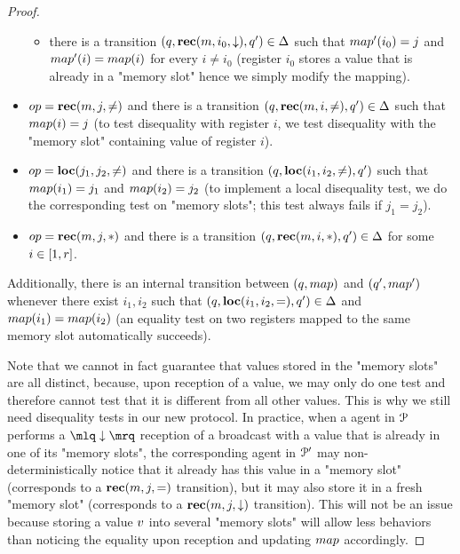 \begin{proof}
\begin{itemize}
\begin{itemize}
			\item there is a transition $(q, \textbf{rec}(m, i_0, \downarrow), q') \in \Delta$ such that $\map'(i_0)=j$ and $\map'(i) = \map(i)$ for every $i \neq i_0$ (register $i_0$ stores a value that is already in a "memory slot" hence we simply modify the mapping).
		\end{itemize} 
		
		\item $\op = \rec{m}{j}{\diseqtestact}$ and there is a transition $(q, \textbf{rec}(m, i, {\ne}), q') \in \Delta$ such that $\map(i)=j$ (to test disequality with register $i$, we test disequality with the "memory slot" containing value of register $i$).
		

		\item $\op=\loc{j_1}{j_2}{\diseqtestact}$ and there is a transition $(q, \textbf{loc}(i_1,i_2,{\ne}), q')$ such that $\map(i_1)=j_1$ and $\map(i_2) = j_2$ (to implement a local disequality test, we do the corresponding test on "memory slots"; this test always fails if $j_1 = j_2$).
		
		
		\item $\op = \rec{m}{j}{\dummyact}$ and there is a transition $(q, \textbf{rec}(m, i, {*}), q') \in \Delta$ for some $i \in [1,r]$.
	\end{itemize}
	
	Additionally, there is an internal transition between $(q,\map)$ and $(q',\map')$ whenever there exist $i_1, i_2$ such that $(q, \textbf{loc}(i_1,i_2,{=}), q') \in \Delta$ and $\map(i_1) = \map(i_2)$ (an equality test on two registers mapped to the same memory slot automatically succeeds).

	Note that we cannot in fact guarantee that values stored in the "memory slots" are all distinct, because, upon reception of a value, we may only do one test and therefore cannot test that it is different from all other values. This is why we still need disequality tests in our new protocol. In practice, when a agent in $\mathcal{P}$ performs a $\quotemarks{\enregact}$ reception of a broadcast with a value that is already in one of its "memory slots", the corresponding agent in $\mathcal{P}'$ may non-deterministically notice that it already has this value in a "memory slot" (corresponds to a $\textbf{rec}(m, j, {=})$ transition), but it may also store it in a fresh "memory slot" (corresponds to a $\textbf{rec}(m, j, \downarrow)$ transition). This will not be an issue because storing a value $v$ into several "memory slots" will allow less behaviors than noticing the equality upon reception and updating $\map$ accordingly.


\end{proof}
